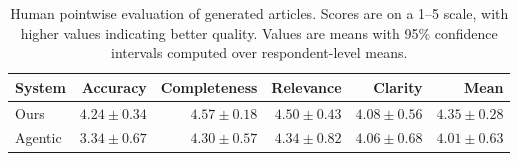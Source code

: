 \begin{table}[t]
\centering
\small
\setlength{\tabcolsep}{4pt}
\begin{tabular}{lrrrrr}
\toprule
System & Accuracy & Completeness & Relevance & Clarity & Mean \\
\midrule
Ours & $4.24{\pm}0.34$ & $4.57{\pm}0.18$ & $4.50{\pm}0.43$ & $4.08{\pm}0.56$ & $4.35{\pm}0.28$ \\
Agentic & $3.34{\pm}0.67$ & $4.30{\pm}0.57$ & $4.34{\pm}0.82$ & $4.06{\pm}0.68$ & $4.01{\pm}0.63$ \\
\bottomrule
\end{tabular}
\caption{Human pointwise evaluation of generated articles. Scores are on a 1--5 scale, with higher values indicating better quality. Values are means with 95\% confidence intervals computed over respondent-level means.}
\label{tab:human_pointwise_generated}
\end{table}
